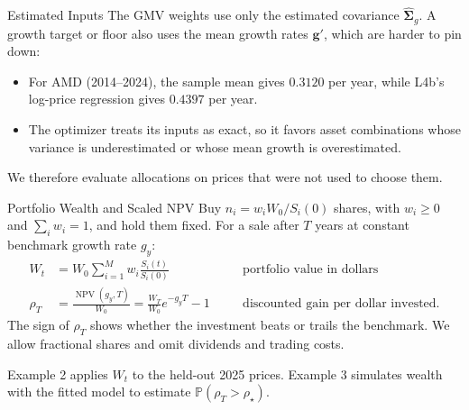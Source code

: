 \documentclass[aspectratio=169,11pt]{beamer}
\newcommand{\Pmeasure}{\mathbb{P}}
\newcommand{\bg}{\mathbf{g}}
\newcommand{\Sg}{\hat{\boldsymbol{\Sigma}}_{g}}
\begin{document}
\begin{frame}{Estimated Inputs}
  The GMV weights use only the estimated covariance $\Sg$. A growth target or
  floor also uses the mean growth rates $\bg'$, which are harder to pin down:
  \begin{itemize}\setlength{\itemsep}{0.8em}
    \item For AMD (2014--2024), the sample mean gives $0.3120$ per year, while
      L4b's log-price regression gives $0.4397$ per year.
    \item The optimizer treats its inputs as exact, so it favors asset
      combinations whose variance is underestimated or whose mean growth is
      overestimated.
  \end{itemize}

  \vspace{0.5em}
  We therefore evaluate allocations on prices that were not used to choose them.
\end{frame}

\begin{frame}{Portfolio Wealth and Scaled NPV}
  Buy $n_i=w_iW_0/S_i(0)$ shares, with $w_i\ge0$ and $\sum_iw_i=1$, and hold
  them fixed. For a sale after $T$ years at constant benchmark growth rate $g_y$:
  \[
    \boxed{
    \begin{aligned}
      W_t&=W_0\sum_{i=1}^{M}w_i\frac{S_i(t)}{S_i(0)}
        &&\quad\text{portfolio value in dollars}\\[0.2em]
      \rho_T&=\frac{\operatorname{NPV}(g_y,T)}{W_0}=\frac{W_T}{W_0}e^{-g_yT}-1
        &&\quad\text{discounted gain per dollar invested}.
    \end{aligned}}
  \]
  The sign of $\rho_T$ shows whether the investment beats or trails the
  benchmark. We allow fractional shares and omit dividends and trading costs.

  \vspace{0.4em}
  Example 2 applies $W_t$ to the held-out 2025 prices. Example 3 simulates
  wealth with the fitted model to estimate $\Pmeasure(\rho_T>\rho_\star)$.
\end{frame}
\end{document}
